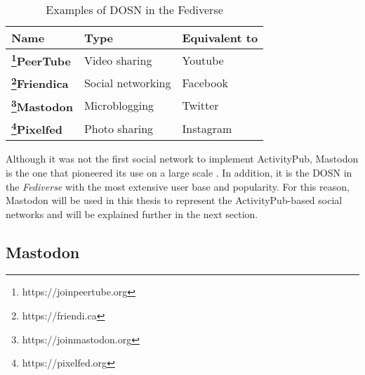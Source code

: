 \begin{table}[H]
  \centering
  \begin{tabular}{|p{4cm}|p{4cm}|p{4cm}| }
    \hline
    \textbf{Name} & \textbf{Type} & \textbf{
      Equivalent to} \\
    \hline
    \hline
    \textbf{\footnote{https://joinpeertube.org}PeerTube} & Video sharing  & Youtube \\
    \textbf{\footnote{https://friendi.ca}Friendica} & Social networking & Facebook \\ 
    \textbf{\footnote{https://joinmastodon.org}Mastodon} & Microblogging & Twitter \\
    \textbf{\footnote{https://pixelfed.org}Pixelfed} & Photo sharing & Instagram \\
      \hline
  \end{tabular}
  \caption{Examples of DOSN in the Fediverse}
  \label{table:fediverse_examples}
\end{table}


Although it was not the first social network to implement ActivityPub, Mastodon is the one that pioneered its use on a large scale \cite{lemmer-webber_2017}. In addition, it is the DOSN in the \emph{Fediverse} with the most extensive user base and popularity. For this reason, Mastodon will be used in this thesis to represent the ActivityPub-based social networks and will be explained further in the next section. 

\subsection{Mastodon}\label{subsec:mastodon}

